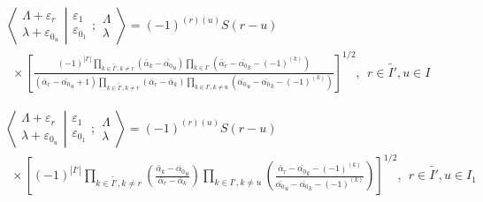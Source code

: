 \documentclass[12pt]{article}
\def\nn{\nonumber}
\begin{document}
\begin{align}
& \left\langle\left. 
\begin{array}{c} \Lambda+\varepsilon_r\\ \lambda+\varepsilon_{0_u} 
 \end{array}
\right|\right.
\left.
\begin{array}{c} \varepsilon_1 \\ \varepsilon_{0_1} 
 \end{array}
; \begin{array}{c} \Lambda \\ \lambda
 \end{array}
\right\rangle = (-1)^{(r)(u)} S(r-u) \nn\\
&~~\times 
\left[ 
\frac{
(-1)^{|I'|} \prod_{k\in\tilde{I'},k \neq r} \left(\bar{\alpha}_k - \bar{\alpha_0}_u \right)
\prod_{k\in I'} \left(\bar{\alpha}_r - \bar{\alpha_0}_k - (-1)^{(k)}\right) 
}
{
(\bar{\alpha}_r-\bar{\alpha_0}_u + 1)
\prod_{k\in \tilde{I'},k\neq r} \left(\bar{\alpha}_r - \bar{\alpha}_k \right)
\prod_{k\in I',k\neq u} \left(\bar{\alpha_0}_u - \bar{\alpha_0}_k - (-1)^{(k)}\right)
}
\right]^{1/2}
, \ \ r\in \tilde{I'},u\in I   \label{FinalBarredEven}
\end{align}


\begin{align}
& \left\langle\left. 
\begin{array}{c} \Lambda+\varepsilon_r\\ \lambda+\varepsilon_{0_u} 
 \end{array}
\right|\right.
\left.
\begin{array}{c} \varepsilon_1 \\ \varepsilon_{0_1} 
 \end{array}
; \begin{array}{c} \Lambda \\ \lambda
 \end{array}
\right\rangle = (-1)^{(r)(u)} S(r-u) \nn\\
&~~\times \left[ (-1)^{|I'|} \prod_{k\in \tilde{I'},k\neq r} 
\left(
\frac 
{\bar{\alpha}_k - \bar{\alpha_0}_u  }
{\bar{\alpha}_r - \bar{\alpha}_k }
\right)
\prod_{k\in I',k \neq u} 
\left(
\frac
{ \bar{\alpha}_r - \bar{\alpha_0}_k - (-1)^{(k)} }
{\bar{\alpha_0}_u - \bar{\alpha_0}_k - (-1)^{(k)} }
\right)
\right]^{1/2}
,\ \ r\in \tilde{I'},u\in I_1 \label{FinalBarredOdd}
\end{align}
\end{document}
